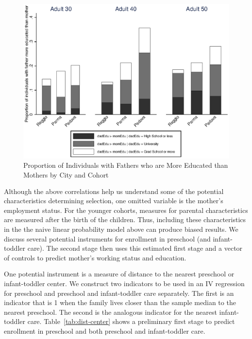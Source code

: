 \begin{figure}[!htb]
	\begin{minipage}{.9\textwidth}
	\centering
	\includegraphics[scale=1]{../../output/image/bar_parentsEduCompare}
	\caption{Proportion of Individuals with Fathers who are More Educated than Mothers by City and Cohort}
	\label{fig:parentsEdu}
	\end{minipage}
\end{figure}

Although the above correlations help us understand some of the potential characteristics determining selection, one omitted variable is the mother's employment status. For the younger cohorts, measures for parental characteristics are measured after the birth of the children. Thus, including these characteristics in the the naive linear probability model above can produce biased results. We discuss several potential instruments for enrollment in preschool (and infant-toddler care). The second stage then uses this estimated first stage and a vector of controls to predict mother's working status and education.

One potential instrument is a measure of distance to the nearest preschool or infant-toddler center. We construct two indicators to be used in an IV regression for preschool and preschool and infant-toddler care separately. The first is an indicator that is 1 when the family lives closer than the sample median to the nearest preschool. The second is the analogous indicator for the nearest infant-toddler care. Table~\ref{tab:dist-center} shows a preliminary first stage to predict enrollment in preschool and both preschool and infant-toddler care. 

